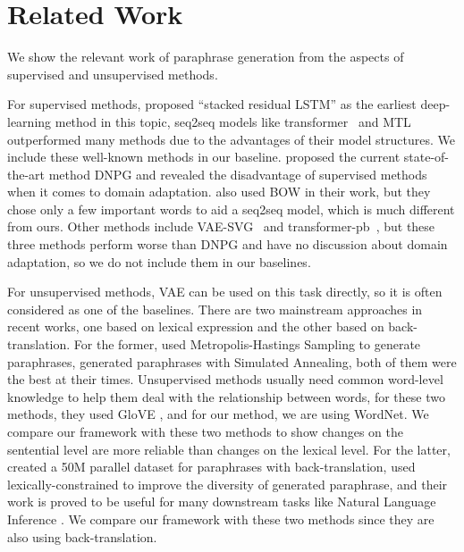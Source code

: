 \section{Related Work}
We show the relevant work of paraphrase generation from the aspects of supervised and unsupervised methods.

For supervised methods, \citet{prakash2016neural} proposed ``stacked residual LSTM'' as the earliest deep-learning method in this topic, seq2seq models like transformer~\citep{vaswani2017attention} and MTL~\citep{domhan2017using} outperformed many methods due to the advantages of their model structures. We include these well-known methods in our baseline.  \citet{li2019decomposable} proposed the current state-of-the-art method DNPG and revealed the disadvantage of supervised methods when it comes to domain adaptation. \citet{fu2019paraphrase} also used BOW in their work, but they chose only a few important words to aid a seq2seq model, which is much different from ours. Other methods include VAE-SVG~\citep{gupta2018deep} and transformer-pb~\citep{wang2019task}, but these three methods perform worse than DNPG and have no discussion about domain adaptation, so we do not include them in our baselines.

For unsupervised methods, VAE\citep{kingma2013auto} can be used on this task directly, so it is often considered as one of the baselines. There are two mainstream approaches in recent works, one based on lexical expression and the other based on back-translation. For the former, \citet{miao2019cgmh} used Metropolis-Hastings Sampling to generate paraphrases, \citet{liu2019unsupervised} generated paraphrases with Simulated Annealing, both of them were the best at their times. Unsupervised methods usually need common word-level knowledge to help them deal with the relationship between words, for these two methods, they used GloVE \citep{pennington2014glove}, and for our method, we are using WordNet. We compare our framework with these two methods to show changes on the sentential level are more reliable than changes on the lexical level. For the latter, \citet{wieting2017paranmt} created a 50M parallel dataset for paraphrases with back-translation, \citet{hu2019parabank} used lexically-constrained to improve the diversity of generated paraphrase, and their work is proved to be useful for many downstream tasks like Natural Language Inference \citep{hu2019improved}. We compare our framework with these two methods since they are also using back-translation.


